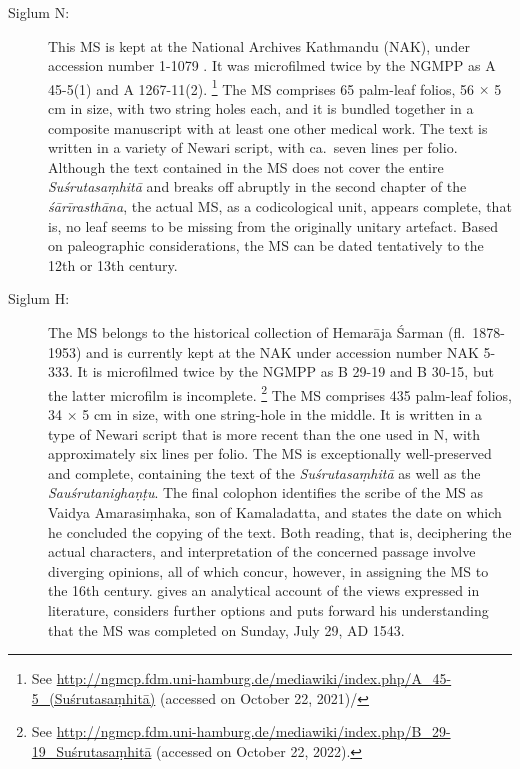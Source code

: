 \begin{description}
\item[Siglum N:] This MS is kept at the National Archives Kathmandu (NAK), under accession number 1-1079 . It was microfilmed twice by the NGMPP as A 45-5(1) and A 1267-11(2).%
    \footnote{%
See 
\url{http://ngmcp.fdm.uni-hamburg.de/mediawiki/index.php/A_45-5_(Suśrutasaṃhitā)}
 (accessed on October 22, 2021)/
    } 
The MS comprises 65 palm-leaf folios, 56 $\times$ 5 cm in size, with two string holes each, and it is bundled together in a composite manuscript with at least one other medical work. The text is written in a variety of Newari script, with ca.\ seven lines per folio. Although the text contained in the MS does not cover the entire \emph{Suśrutasaṃhitā} and breaks off abruptly in the second chapter of the \emph{śārīrasthāna}, the actual MS, as a codicological unit, appears complete, that is, no leaf seems to be missing from the originally unitary artefact. Based on paleographic considerations, the MS can be dated tentatively to the 12th or 13th century.

\item[Siglum H:] The MS belongs to the historical collection of Hemarāja Śarman (fl.\ 1878-1953) and is currently kept at the NAK under accession number NAK 5-333. It is microfilmed twice by the NGMPP as B 29-19 and B 30-15, but the latter microfilm is incomplete.%
    \footnote{%
    See 
    \url{http://ngmcp.fdm.uni-hamburg.de/mediawiki/index.php/B_29-19_Suśrutasaṃhitā}
     (accessed on October 22, 2022).
    } 
The MS comprises 435 palm-leaf folios, 34 $\times$ 5 cm in size, with one string-hole in the middle. It is written in a type of Newari script that is more recent than the one used in N, with approximately six lines per folio. The MS is exceptionally well-preserved and complete, containing the text of the \emph{Suśrutasaṃhitā} as well as the \emph{Sauśrutanighaṇṭu}. The final colophon identifies the scribe of the MS as Vaidya Amarasiṃhaka, son of Kamaladatta, and states the date on which he concluded the copying of the text. Both reading, that is, deciphering the actual characters, and interpretation of the concerned passage involve diverging opinions, all of which concur, however, in assigning the MS to the 16th century. \textcites[21--26]{kleb-2021b} gives an analytical account of the views expressed in literature, considers further options and puts forward his understanding that the MS was completed on Sunday, July 29, AD 1543.  
\end{description}
  
